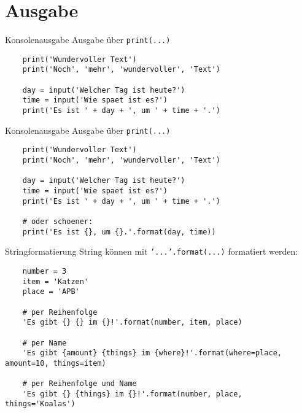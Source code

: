 \section{Ausgabe}

\begin{frame}[fragile]{Konsolenausgabe}
	Ausgabe über \texttt{print(...)}

	\begin{lstlisting}
	print('Wundervoller Text')
	print('Noch', 'mehr', 'wundervoller', 'Text')

	day = input('Welcher Tag ist heute?')
	time = input('Wie spaet ist es?')
	print('Es ist ' + day + ', um ' + time + '.')
	\end{lstlisting}
\end{frame}

\begin{frame}[fragile]{Konsolenausgabe}
	Ausgabe über \texttt{print(...)}

	\begin{lstlisting}
	print('Wundervoller Text')
	print('Noch', 'mehr', 'wundervoller', 'Text')

	day = input('Welcher Tag ist heute?')
	time = input('Wie spaet ist es?')
	print('Es ist ' + day + ', um ' + time + '.')

	# oder schoener:
	print('Es ist {}, um {}.'.format(day, time))
	\end{lstlisting}
\end{frame}

\begin{frame}[fragile]{Stringformatierung}
	String können mit \texttt{'...'.format(...)} formatiert werden:

	\begin{lstlisting}
	number = 3
	item = 'Katzen'
	place = 'APB'

	# per Reihenfolge
	'Es gibt {} {} im {}!'.format(number, item, place)

	# per Name
	'Es gibt {amount} {things} im {where}!'.format(where=place, amount=10, things=item)

	# per Reihenfolge und Name
	'Es gibt {} {things} im {}!'.format(number, place, things='Koalas')
	\end{lstlisting}
\end{frame}


